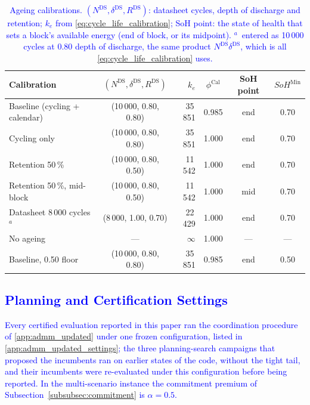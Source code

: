 \documentclass[preprint,12pt]{elsarticle}
\begin{document}
\begin{table}[htbp!]
    \centering
    \caption{\textcolor{blue}{Ageing calibrations. $(N^{\text{DS}}, \delta^{\text{DS}}, R^{\text{DS}})$: datasheet cycles,
    depth of discharge and retention; $k_e$ from \eqref{eq:cycle_life_calibration}; SoH point: the state of health
    that sets a block's available energy (end of block, or its midpoint). $^{a}$~entered as 10\,000 cycles at 0.80 depth of discharge, the same product $N^{\text{DS}} \delta^{\text{DS}}$, which is all \eqref{eq:cycle_life_calibration} uses.}}
    \footnotesize\setlength{\tabcolsep}{4pt}
    \begin{tabular}{l c r c c c}
        \toprule
        Calibration & $(N^{\text{DS}}, \delta^{\text{DS}}, R^{\text{DS}})$ & $k_e$ & $\phi^{\text{Cal}}$ & SoH point & $SoH^{\text{Min}}$ \\
        \midrule
        Baseline (cycling + calendar) & (10\,000, 0.80, 0.80) & 35\,851 & 0.985 & end & 0.70 \\
        Cycling only                  & (10\,000, 0.80, 0.80) & 35\,851 & 1.000 & end & 0.70 \\
        Retention 50\,\%              & (10\,000, 0.80, 0.50) & 11\,542 & 1.000 & end & 0.70 \\
        Retention 50\,\%, mid-block   & (10\,000, 0.80, 0.50) & 11\,542 & 1.000 & mid & 0.70 \\
        Datasheet 8\,000 cycles$^{a}$ & (8\,000, 1.00, 0.70)  & 22\,429 & 1.000 & end & 0.70 \\
        No ageing                     & ---                   & $\infty$ & 1.000 & --- & --- \\
        Baseline, 0.50 floor          & (10\,000, 0.80, 0.80) & 35\,851 & 0.985 & end & 0.50 \\
        \bottomrule
    \end{tabular}
    \label{tab:ageing_calibrations}
\end{table}

\subsection{\textcolor{blue}{Planning and Certification Settings}}
\label{sec:case_settings}

\textcolor{blue}{
    Every certified evaluation reported in this paper ran the coordination procedure of \ref{app:admm_updated} under one frozen configuration, listed in \ref{app:admm_updated_settings}; the three planning-search campaigns that proposed the incumbents ran on earlier states of the code, without the tight tail, and their incumbents were re-evaluated under this configuration before being reported. In the multi-scenario instance the commitment premium of Subsection~\ref{subsubsec:commitment} is $\alpha = 0.5$.
}
\end{document}
